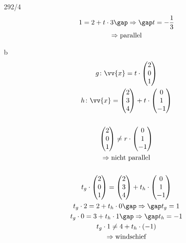 \begin{exercise}{292/4}
\begin{gather*}
    1 = 2 + t \cdot 3 \gap\Rightarrow\gap t = -\frac{1}{3} \\
    \Rightarrow \text{parallel}
  \end{gather*}
  \item [b]
  \begin{gather*}
    g \colon \vv{x} = t \cdot \begin{pmatrix}2 \\ 0 \\ 1\end{pmatrix} \\
    h \colon \vv{x} = \begin{pmatrix}2 \\ 3 \\ 4\end{pmatrix} + t \cdot \begin{pmatrix}0 \\ 1 \\ -1\end{pmatrix} \\\\
    \begin{pmatrix}2 \\ 0 \\ 1\end{pmatrix} \neq r \cdot \begin{pmatrix}0 \\ 1 \\ -1\end{pmatrix} \\
    \Rightarrow \text{nicht parallel} \\\\
    t_g \cdot \begin{pmatrix}2 \\ 0 \\ 1\end{pmatrix} = \begin{pmatrix}2 \\ 3 \\ 4\end{pmatrix} + t_h \cdot \begin{pmatrix}0 \\ 1 \\ -1\end{pmatrix} \\
    t_g \cdot 2 = 2 + t_h \cdot 0 \gap\Rightarrow\gap t_g = 1 \\
    t_g \cdot 0 = 3 + t_h \cdot 1 \gap\Rightarrow\gap t_h = -1 \\
    t_g \cdot 1 \neq 4 + t_h \cdot (-1) \\
    \Rightarrow \text{windschief}
  \end{gather*}
\end{exercise}
